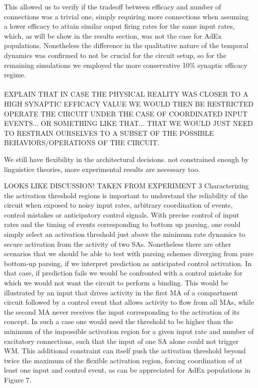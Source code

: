 \documentclass[10pt]{article}
\begin{document}
This allowed us to verify if the tradeoff between efficacy and number of connections was a trivial one, simply requiring more connections when assuming a lower efficacy to attain similar ouput firing rates for the same input rates, which, as will be show in the results section, was not the case for AdEx populations.
Nonetheless the difference in the qualitative nature of the temporal dynamics was confirmed to not be crucial for the circuit setup, so for the remaining simulations we employed the more conservative 10\% synaptic efficacy regime.\\~\\

EXPLAIN THAT IN CASE THE PHYSICAL REALITY WAS CLOSER TO A HIGH SYNAPTIC EFFICACY VALUE WE WOULD THEN BE RESTRICTED OPERATE THE CIRCUIT UNDER THE CASE OF COORDINATED INPUT EVENTS... OR SOMETHING LIKE THAT... THAT WE WOULD JUST NEED TO RESTRAIN OURSELVES TO A SUBSET OF THE POSSIBLE BEHAVIORS/OPERATIONS OF THE CIRCUIT. 


We still have flexibility in the architectural decisions. not constrained enough by linguistice theories, more experimental results are necessary too.


LOOKS LIKE DISCUSSION! TAKEN FROM EXPERIMENT 3
Characterizing the activation threshold regions is important to understand the reliability of the circuit when exposed to noisy input rates, arbitrary coordination of events, control mistakes or anticipatory control signals.
With precise control of input rates and the timing of events corresponding to bottom up parsing, one could simply select an activation threshold just above the minimum rate dynamics to secure activation from the activity of two SAs.
Nonetheless there are other scenarios that we should be able to test with parsing schemes diverging from pure bottom-up parsing, if we interpret prediction as anticipated control activation.
In that case, if prediction fails we would be confronted with a control mistake for which we would not want the circuit to perform a binding.
This would be illustrated by an input that drives activity in the first MA of a compartment circuit followed by a control event that allows activity to flow from all MAs, while the second MA never receives the input corresponding to the activation of its concept.
In such a case one would need the threshold to be higher than the minimum of the impossible activation region for a given input rate and number of excitatory connections, such that the input of one SA alone could not trigger WM.
This additional constraint can itself push the activation threshold beyond twice the maximum of the flexible activation region, forcing coordination of at least one input and control event, as can be appreciated for AdEx populations in Figure 7.
\end{document}

